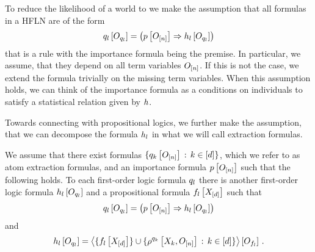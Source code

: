 

To reduce the likelihood of a world to we make the assumption that all formulas in a HFLN are of the form
\begin{align}
    \label{eq:folImplicationForm}
    q_{l}\left[O_{q_{l}}\right]
    = \left( p\left[O_{[n]}\right] \Rightarrow h_{l}\left[O_{q_{l}}\right] \right)
\end{align}
that is a rule with the importance formula being the premise.
In particular, we assume, that they depend on all term variables $O_{[n]}$.
If this is not the case, we extend the formula trivially on the missing term variables.
When this assumption holds, we can think of the importance formula as a conditions on individuals to satisfy a statistical relation given by $h$.

Towards connecting with propositional logics, we further make the assumption, that we can decompose the formula $h_{l}$ in what we will call extraction formulas.

\begin{assumption}
    \label{ass:propositionalHeads}
    We assume that there exist formulas $\{q_{k}\left[O_{[n]}\right] \, : \, k\in[d]\}$, which we refer to as atom extraction formulas, and an importance formula $p\left[O_{[n]}\right]$ such that the following holds.
    To each first-order logic formula $q_{l}$ there is another first-order logic formula $h_{l}\left[O_{q_{l}}\right]$ and a propositional formula $f_{l}\left[X_{[d]}\right]$ such that
    \begin{align*}
        q_{l}\left[O_{q_{l}}\right]
        = \left( p\left[O_{[n]}\right] \Rightarrow h_{l}\left[O_{q_{l}}\right] \right)
    \end{align*}
    and
    \begin{align*}
        h_{l}\left[O_{q_{l}}\right] =
        \left\langle 
            \{f_{l}\left[X_{[d]}\right]\} \cup \{\rho^{q_{k}}\left[X_{k},O_{[n]}\right] \, : \, k\in[d]\}
        \right\rangle \left[ O_{f_{l}} \right] \, .
    \end{align*}
\end{assumption}

